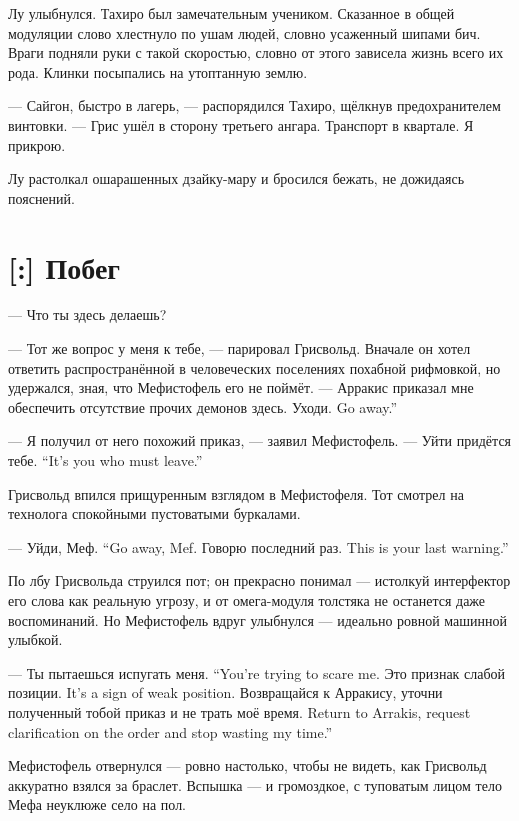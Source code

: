 Лу улыбнулся.
Тахиро был замечательным учеником.
Сказанное в общей модуляции слово хлестнуло по ушам людей, словно усаженный шипами бич.
Враги подняли руки с такой скоростью, словно от этого зависела жизнь всего их рода.
Клинки посыпались на утоптанную землю.

--- Сайгон, быстро в лагерь, --- распорядился Тахиро, щёлкнув предохранителем винтовки.
--- Грис ушёл в сторону третьего ангара.
Транспорт в квартале.
Я прикрою.

Лу растолкал ошарашенных дзайку-мару и бросился бежать, не дожидаясь пояснений.

\section{[:] Побег}

\textspace

--- Что ты здесь делаешь?

--- Тот же вопрос у меня к тебе, --- парировал Грисвольд.
Вначале он хотел ответить распространённой в человеческих поселениях похабной рифмовкой, но удержался, зная, что Мефистофель его не поймёт.
--- Арракис приказал мне обеспечить отсутствие прочих демонов здесь.
{Уходи.}
{Go away.''}

--- Я получил от него похожий приказ, --- заявил Мефистофель.
{--- Уйти придётся тебе.}
{``It's you who must leave.''}

Грисвольд впился прищуренным взглядом в Мефистофеля.
Тот смотрел на технолога спокойными пустоватыми буркалами.

{--- Уйди, Меф.}
{``Go away, Mef.}
{Говорю последний раз.}
{This is your last warning.''}

По лбу Грисвольда струился пот;
он прекрасно понимал --- истолкуй интерфектор его слова как реальную угрозу, и от омега-модуля толстяка не останется даже воспоминаний.
Но Мефистофель вдруг улыбнулся --- идеально ровной машинной улыбкой.

{--- Ты пытаешься испугать меня.}
{``You're trying to scare me.}
{Это признак слабой позиции.}
{It's a sign of weak position.}
{Возвращайся к Арракису, уточни полученный тобой приказ и не трать моё время.}
{Return to Arrakis, request clarification on the order and stop wasting my time.''}

Мефистофель отвернулся --- ровно настолько, чтобы не видеть, как Грисвольд аккуратно взялся за браслет.
Вспышка --- и громоздкое, с туповатым лицом тело Мефа неуклюже село на пол.


